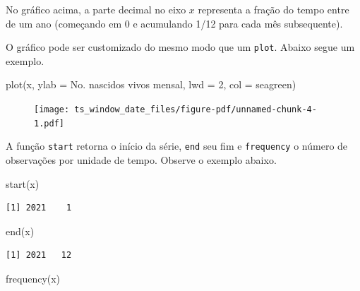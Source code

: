 \documentclass[
  letterpaper,
  DIV=11,
  numbers=noendperiod]{scrreprt}
\newenvironment{Shaded}{\begin{snugshade}}{\end{snugshade}}
\newcommand{\AttributeTok}[1]{\textcolor[rgb]{0.40,0.45,0.13}{#1}}
\newcommand{\DecValTok}[1]{\textcolor[rgb]{0.68,0.00,0.00}{#1}}
\newcommand{\FunctionTok}[1]{\textcolor[rgb]{0.28,0.35,0.67}{#1}}
\newcommand{\NormalTok}[1]{\textcolor[rgb]{0.00,0.23,0.31}{#1}}
\newcommand{\StringTok}[1]{\textcolor[rgb]{0.13,0.47,0.30}{#1}}
\theoremstyle{definition}
\theoremstyle{plain}
\theoremstyle{definition}
\theoremstyle{plain}
\theoremstyle{remark}
\begin{document}
No gráfico acima, a parte decimal no eixo \(x\) representa a fração do
tempo entre de um ano (começando em 0 e acumulando 1/12 para cada mês
subsequente).

O gráfico pode ser customizado do mesmo modo que um \texttt{plot}.
Abaixo segue um exemplo.

\begin{Shaded}
\begin{Highlighting}[]
\FunctionTok{plot}\NormalTok{(x, }\AttributeTok{ylab =} \StringTok{\textquotesingle{}No. nascidos vivos mensal\textquotesingle{}}\NormalTok{, }\AttributeTok{lwd =} \DecValTok{2}\NormalTok{, }\AttributeTok{col =} \StringTok{\textquotesingle{}seagreen\textquotesingle{}}\NormalTok{)}
\end{Highlighting}
\end{Shaded}

\begin{figure}[H]

{\centering \texttt{[image: ts\_window\_date\_files/figure-pdf/unnamed-chunk-4-1.pdf]}

}

\end{figure}

A função \texttt{start} retorna o início da série, \texttt{end} seu fim
e \texttt{frequency} o número de observações por unidade de tempo.
Observe o exemplo abaixo.

\begin{Shaded}
\begin{Highlighting}[]
\FunctionTok{start}\NormalTok{(x)}
\end{Highlighting}
\end{Shaded}

\begin{verbatim}
[1] 2021    1
\end{verbatim}

\begin{Shaded}
\begin{Highlighting}[]
\FunctionTok{end}\NormalTok{(x)}
\end{Highlighting}
\end{Shaded}

\begin{verbatim}
[1] 2021   12
\end{verbatim}

\begin{Shaded}
\begin{Highlighting}[]
\FunctionTok{frequency}\NormalTok{(x)}
\end{Highlighting}
\end{Shaded}
\end{document}
